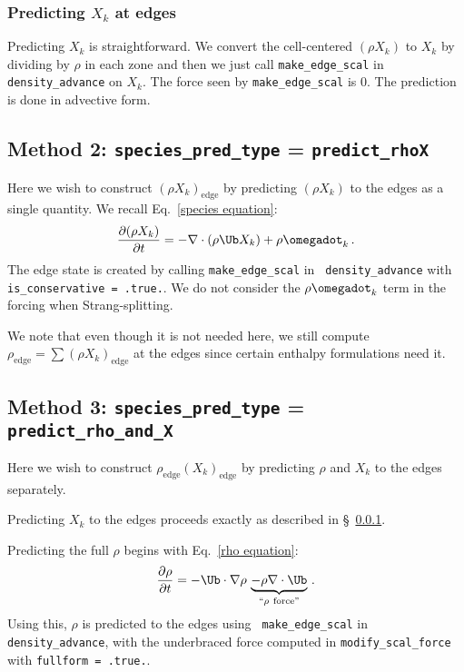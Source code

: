 \subsubsection{Predicting $X_k$ at edges}
\label{sec:pert:predict_X}
Predicting $X_k$ is straightforward.  We convert the cell-centered
$(\rho X_k)$ to $X_k$ by dividing by $\rho$ in each zone and then we
just call {\tt make\_edge\_scal} in {\tt density\_advance} on $X_k$.
The force seen by {\tt make\_edge\_scal} is 0.  The prediction is
done in advective form.


\subsection{Method 2: {\tt species\_pred\_type} = {\tt predict\_rhoX}}

Here we wish to construct $(\rho X_k)_\mathrm{edge}$ by predicting
$(\rho X_k)$ to the edges as a single quantity.  We recall
Eq.~\ref{species equation}:
\begin{equation}
\frac{\partial(\rho X_k)}{\partial t} =
  -\nabla \cdot (\rho \Ub X_k) + \rho \omegadot_k \, . \nonumber
\end{equation}
The edge state is created by calling {\tt make\_edge\_scal} in {\tt
  density\_advance} with {\tt is\_conservative = .true.}.
We do not consider the $\rho \omegadot_k$ term in the forcing when
Strang-splitting.


We note that even though it is not needed here, we still compute
$\rho_\mathrm{edge}=\sum(\rho X_k)_\mathrm{edge}$ at the edges since certain 
enthalpy formulations need it.


\subsection{Method 3: {\tt species\_pred\_type} = {\tt predict\_rho\_and\_X}}

Here we wish to construct $\rho_\mathrm{edge} (X_k)_\mathrm{edge}$
by predicting $\rho$ and $X_k$ to the edges separately.

Predicting $X_k$ to the edges proceeds exactly as described in
\S~\ref{sec:pert:predict_X}.  

Predicting the full $\rho$ begins with Eq.~\ref{rho equation}:
\begin{equation}
\frac{\partial\rho}{\partial t} 
= -\Ub\cdot\nabla\rho \, \underbrace{- \rho\nabla\cdot\Ub}_{``\rho~\text{force''}} \, . \label{rho equation labeled}
\end{equation}
Using this, $\rho$ is predicted to the edges using {\tt
  make\_edge\_scal} in {\tt density\_advance}, with the underbraced
force computed in {\tt modify\_scal\_force} with {\tt fullform =
  .true.}.  

